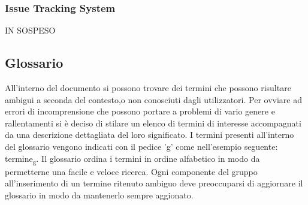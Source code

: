 \subsubsection{Issue Tracking System}
IN SOSPESO

\subsection{Glossario}
All'interno del documento si possono trovare dei termini che possono risultare ambigui a seconda del contesto,o non conosciuti dagli utilizzatori.
Per ovviare ad errori di incomprensione che possono portare a problemi di vario genere e rallentamenti si è deciso di stilare un elenco di termini 
di interesse accompagnati da una descrizione dettagliata del loro significato.
I termini presenti all'interno del glossario vengono indicati con il pedice 'g' come nell'esempio seguente: termine\textsubscript{g}.
Il glossario ordina i termini in ordine alfabetico in modo da permetterne una facile e veloce ricerca.
Ogni componente del gruppo all'inserimento di un termine ritenuto ambiguo deve preoccuparsi di aggiornare il glossario in modo da mantenerlo sempre aggionato.
